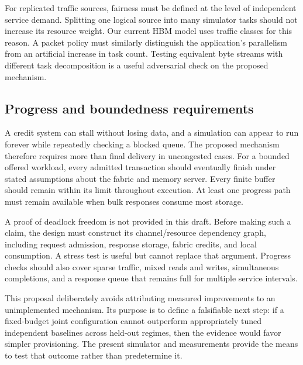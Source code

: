 For replicated traffic sources, fairness must be defined at the level of independent service demand. Splitting one logical source into many simulator tasks should not increase its resource weight. Our current HBM model uses traffic classes for this reason. A packet policy must similarly distinguish the application's parallelism from an artificial increase in task count. Testing equivalent byte streams with different task decomposition is a useful adversarial check on the proposed mechanism.

\subsection{Progress and boundedness requirements}
A credit system can stall without losing data, and a simulation can appear to run forever while repeatedly checking a blocked queue. The proposed mechanism therefore requires more than final delivery in uncongested cases. For a bounded offered workload, every admitted transaction should eventually finish under stated assumptions about the fabric and memory server. Every finite buffer should remain within its limit throughout execution. At least one progress path must remain available when bulk responses consume most storage.

A proof of deadlock freedom is not provided in this draft. Before making such a claim, the design must construct its channel/resource dependency graph, including request admission, response storage, fabric credits, and local consumption. A stress test is useful but cannot replace that argument. Progress checks should also cover sparse traffic, mixed reads and writes, simultaneous completions, and a response queue that remains full for multiple service intervals.

This proposal deliberately avoids attributing measured improvements to an unimplemented mechanism. Its purpose is to define a falsifiable next step: if a fixed-budget joint configuration cannot outperform appropriately tuned independent baselines across held-out regimes, then the evidence would favor simpler provisioning. The present simulator and measurements provide the means to test that outcome rather than predetermine it.
